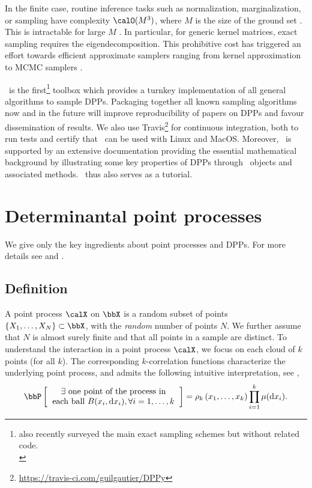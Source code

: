 \documentclass[twoside,11pt]{article}
\begin{document}
 In the finite case, routine inference tasks such as normalization, marginalization,  or sampling have complexity $\calO(M^3)$, where $M$ is the size of the ground set \citep{KuTa12}. This is  intractable for large $M$ \citep{Gil14}. 
  In particular, for generic kernel matrices, exact sampling requires the eigendecomposition. 
  This prohibitive cost has triggered an effort towards efficient approximate samplers ranging from kernel approximation \citep{AKFT13} to MCMC samplers \citep{AnGhRe16, LiJeSr16c, GaBaVa17}.
 
   \setcounter{footnote}{0}
  \DPPy\ is the first\footnote{\citet{TrBaAm18} also recently surveyed the main exact sampling schemes but without related code.\\}
 toolbox which provides a turnkey implementation of all general algorithms to sample DPPs.  Packaging together all known sampling algorithms now and in the future will improve reproducibility of papers on DPPs and favour dissemination of results.
  \setcounter{footnote}{5}
  We also use Travis\footnote{\url{https://travis-ci.com/guilgautier/DPPy}} for continuous integration, both to run tests and certify that \DPPy\ can be used with Linux and MacOS. 
  Moreover, \DPPy\ is supported by an extensive documentation providing the essential mathematical background by illustrating some key properties of DPPs through \DPPy\ objects and associated methods.
  \DPPy\ thus also serves as a tutorial.


\section{Determinantal point processes} %
\label{sec:determinantal_point_processes}

We give only the key ingredients about point processes and DPPs. For more details see \citet{DaVe03} and \citet{HKPV06}.

  \subsection{Definition} %
  \label{sub:definition}

    A point process $\calX$ on $\bbX$ is a random subset of points $\lrcb{X_1, \dots, X_N} \subset \bbX$, with the \emph{random} number of points $N$. We further assume that $N$ is almost surely finite and that all points in a sample are distinct.
    To understand the interaction in a point process $\calX$, we focus on each cloud of $k$ points (for all $k$). 
    The corresponding $k$-correlation functions characterize the underlying point process, and admits the following intuitive interpretation, see \citet[Section 4]{MoWa04},
    \begin{equation}
    	\Proba{
    		\begin{tabular}{c}
    			$\exists$ one point of the process in\\
    			each ball $B(x_i, \diff x_i), \forall i=1,\dots, k $
    		\end{tabular}
    	}
    	= \rho_k\lrp{x_1,\dots,x_k}
    		\prod_{i=1}^k \mu(\diff x_i).
    \end{equation}
\end{document}

